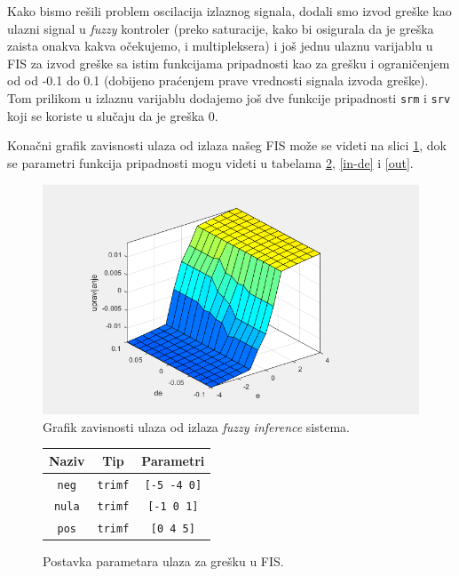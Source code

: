\documentclass[10pt,a4paper,titlepage,croatian]{article}
\begin{document}
Kako bismo rešili problem oscilacija izlaznog signala, dodali smo izvod greške kao ulazni signal u \textit{fuzzy} kontroler (preko saturacije, kako bi osigurala da je greška zaista onakva kakva očekujemo, i multipleksera) i još jednu ulaznu varijablu u FIS za izvod greške sa istim funkcijama pripadnosti kao za grešku i ograničenjem od od -0.1 do 0.1 (dobijeno praćenjem prave vrednosti signala izvoda greške). Tom prilikom u izlaznu varijablu dodajemo još dve funkcije pripadnosti \texttt{srm} i \texttt{srv} koji se koriste u slučaju da je greška 0.

Konačni grafik zavisnosti ulaza od izlaza našeg FIS može se videti na slici \ref{FIS}, dok se parametri funkcija pripadnosti mogu videti u tabelama \ref{in-e}, \ref{in-de} i \ref{out}.

\begin{figure}[H]
    \centering
    \includegraphics[width=\textwidth]{FL_FIS.png}
    \caption{Grafik zavisnosti ulaza od izlaza \textit{fuzzy inference} sistema.}
    \label{FIS}
\end{figure}

\begin{figure}[H]
    \centering
    \begin{tabular}{|c|c|c|}
        \hline
        Naziv & Tip & Parametri \\
        \hline
        \texttt{neg} & \texttt{trimf} & \texttt{[-5 -4 0]} \\
        \hline
        \texttt{nula} & \texttt{trimf} & \texttt{[-1 0 1]} \\
        \hline
        \texttt{pos} & \texttt{trimf} & \texttt{[0 4 5]} \\
        \hline
    \end{tabular}
    \caption{Postavka parametara ulaza za grešku u FIS.}
    \label{in-e}
\end{figure}
\end{document}
